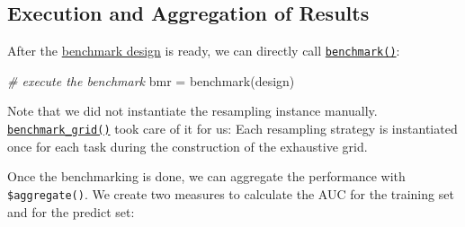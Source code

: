 \documentclass[
]{scrbook}
\newenvironment{Shaded}{\begin{snugshade}}{\end{snugshade}}
\newcommand{\AttributeTok}[1]{\textcolor[rgb]{0.77,0.63,0.00}{#1}}
\newcommand{\CommentTok}[1]{\textcolor[rgb]{0.56,0.35,0.01}{\textit{#1}}}
\newcommand{\FunctionTok}[1]{\textcolor[rgb]{0.00,0.00,0.00}{#1}}
\newcommand{\NormalTok}[1]{#1}
\newcommand{\OtherTok}[1]{\textcolor[rgb]{0.56,0.35,0.01}{#1}}
\newcommand{\SpecialCharTok}[1]{\textcolor[rgb]{0.00,0.00,0.00}{#1}}
\newcommand{\StringTok}[1]{\textcolor[rgb]{0.31,0.60,0.02}{#1}}
\renewenvironment{Shaded} {\begin{snugshade}\small} {\end{snugshade}}
\begin{document}
\hypertarget{bm-exec}{%
\subsection{Execution and Aggregation of Results}\label{bm-exec}}

After the \protect\hyperlink{bm-design}{benchmark design} is ready, we can directly call \href{https://mlr3.mlr-org.com/reference/benchmark.html}{\texttt{benchmark()}}:

\begin{Shaded}
\begin{Highlighting}[]
\CommentTok{\# execute the benchmark}
\NormalTok{bmr }\OtherTok{=} \FunctionTok{benchmark}\NormalTok{(design)}
\end{Highlighting}
\end{Shaded}

Note that we did not instantiate the resampling instance manually.
\href{https://mlr3.mlr-org.com/reference/benchmark_grid.html}{\texttt{benchmark\_grid()}} took care of it for us:
Each resampling strategy is instantiated once for each task during the construction of the exhaustive grid.

Once the benchmarking is done, we can aggregate the performance with \texttt{\$aggregate()}.
We create two measures to calculate the AUC for the training set and for the predict set:

\begin{Shaded}
\end{Shaded}
\end{document}
